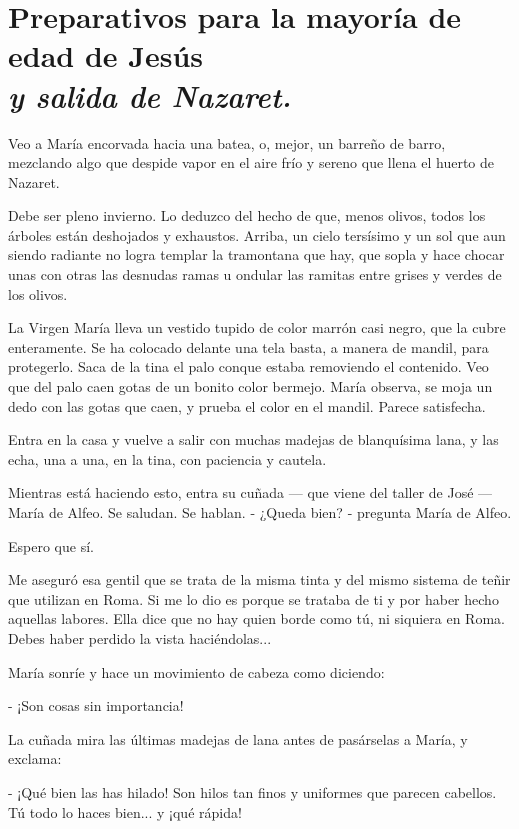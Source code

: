 \documentclass[12pt]{book} %
\begin{document}
\chapter*{Preparativos para la mayoría de edad de Jesús \\ \normalfont\normalsize\textit{y salida de Nazaret.}}
  
Veo a María encorvada hacia una batea, o, mejor, un barreño de barro, mezclando algo que despide vapor en el aire frío y sereno que llena el huerto de Nazaret. 

Debe ser pleno invierno. Lo deduzco del hecho de que, menos olivos, todos los árboles están deshojados y exhaustos. Arriba, un cielo tersísimo y un sol que aun siendo radiante no logra templar la tramontana que hay, que sopla y hace chocar unas con otras las desnudas ramas u ondular las ramitas entre grises y verdes de los olivos. 

La Virgen María lleva un vestido tupido de color marrón casi negro, que la cubre enteramente. Se ha colocado delante una tela basta, a manera de mandil, para protegerlo. Saca de la tina el palo conque estaba removiendo el contenido. Veo que del palo caen gotas de un bonito color bermejo. María observa, se moja un dedo con las gotas que caen, y prueba el color en el mandil. Parece satisfecha. 

Entra en la casa y vuelve a salir con muchas madejas de blanquísima lana, y las echa, una a una, en la tina, con paciencia y cautela. 

Mientras está haciendo esto, entra su cuñada — que viene del taller de José — María de Alfeo. Se saludan. Se hablan. - ¿Queda bien? - pregunta María de Alfeo. 

Espero que sí. 

Me aseguró esa gentil que se trata de la misma tinta y del mismo sistema de teñir que utilizan en Roma. Si me lo dio es porque se trataba de ti y por haber hecho aquellas labores. Ella dice que no hay quien borde como tú, ni siquiera en Roma. Debes haber perdido la vista haciéndolas... 

María sonríe y hace un movimiento de cabeza como diciendo: 

- ¡Son cosas sin importancia! 

La cuñada mira las últimas madejas de lana antes de pasárselas a María, y exclama: 

- ¡Qué bien las has hilado! Son hilos tan finos y uniformes que parecen cabellos. Tú todo lo haces bien... y ¡qué rápida! 
\end{document}
